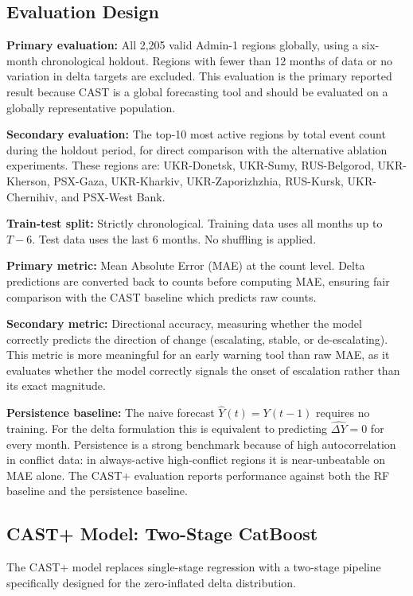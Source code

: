 \documentclass[12pt,a4paper]{article}
\begin{document}
\subsection{Evaluation Design}

\textbf{Primary evaluation:} All 2,205 valid Admin-1 regions globally,
using a six-month chronological holdout. Regions with fewer than 12
months of data or no variation in delta targets are excluded. This
evaluation is the primary reported result because CAST is a global
forecasting tool and should be evaluated on a globally representative
population.

\textbf{Secondary evaluation:} The top-10 most active regions by total
event count during the holdout period, for direct comparison with the
alternative ablation experiments. These regions are: UKR-Donetsk,
UKR-Sumy, RUS-Belgorod, UKR-Kherson, PSX-Gaza, UKR-Kharkiv,
UKR-Zaporizhzhia, RUS-Kursk, UKR-Chernihiv, and PSX-West Bank.

\textbf{Train-test split:} Strictly chronological. Training data uses
all months up to $T-6$. Test data uses the last 6 months. No shuffling
is applied.

\textbf{Primary metric:} Mean Absolute Error (MAE) at the count level.
Delta predictions are converted back to counts before computing MAE,
ensuring fair comparison with the CAST baseline which predicts raw counts.

\textbf{Secondary metric:} Directional accuracy, measuring whether the
model correctly predicts the direction of change (escalating, stable, or
de-escalating). This metric is more meaningful for an early warning tool
than raw MAE, as it evaluates whether the model correctly signals the
onset of escalation rather than its exact magnitude.

\textbf{Persistence baseline:} The naive forecast $\hat{Y}(t) = Y(t-1)$
requires no training. For the delta formulation this is equivalent to
predicting $\hat{\Delta Y} = 0$ for every month. Persistence is a strong
benchmark because of high autocorrelation in conflict data: in always-active
high-conflict regions it is near-unbeatable on MAE alone. The CAST+
evaluation reports performance against both the RF baseline and the
persistence baseline.

\subsection{CAST+ Model: Two-Stage CatBoost}

The CAST+ model replaces single-stage regression with a two-stage
pipeline specifically designed for the zero-inflated delta distribution.
\end{document}
